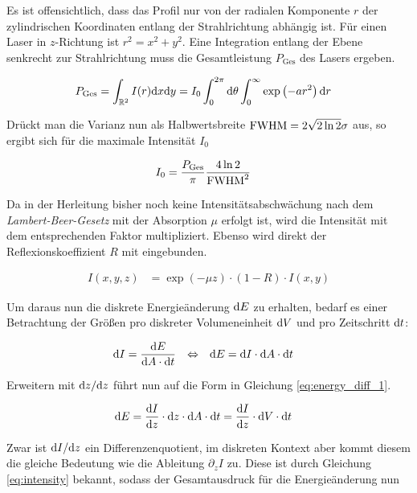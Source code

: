 		Es ist offensichtlich, dass das Profil nur von der radialen Komponente $r$ der
		zylindrischen Koordinaten entlang der Strahlrichtung abhängig ist. Für einen Laser in
		$z$-Richtung ist $r^2 = x^2 + y^2$. Eine Integration entlang der Ebene senkrecht zur
		Strahlrichtung muss die Gesamtleistung $P_\text{Ges}$ des Lasers ergeben.

		\begin{align}
			P_\text{Ges} &= \int_{\mathbb{R}^2} I(r) \dx\dx[y]
				= I_0 \int_0^{2\pi} \dx[\theta] \int_0^\infty \exp\left(-a r^2\right) \dx[r]
		\end{align}

		Drückt man die Varianz nun als Halbwertsbreite $\fwhm = 2\sqrt{2 \ln2}\sigma$ aus, so
		ergibt sich für die maximale Intensität $I_0$

		\begin{align}
			I_0 &= \frac{P_\text{Ges}}{\pi} \frac{4\ln2}{\fwhm^2}
		\end{align}

		Da in der Herleitung bisher noch keine Intensitätsabschwächung nach dem
		\emph{Lambert-Beer-Gesetz} mit der Absorption $\mu$ erfolgt ist, wird die Intensität mit
		dem entsprechenden Faktor multipliziert. Ebenso wird direkt der Reflexionskoeffizient
		$R$ mit eingebunden.

		\begin{align}
			I(x,y,z) &= \exp\left(-\mu z\right) \cdot (1-R) \cdot I(x,y)
			\label{eq:intensity}
		\end{align}

		Um daraus nun die diskrete Energieänderung $\dx[E]$ zu erhalten, bedarf es einer
		Betrachtung der Größen pro diskreter Volumeneinheit $\dx[V]$ und pro Zeitschritt $\dt$:

		\begin{align}
			\dx[I] &= \frac{\dx[E]}{\dx[A]\cdot\dt}
			&\Leftrightarrow&&
			\dx[E] &= \dx[I] \cdot \dx[A] \cdot \dt
		\end{align}

		Erweitern mit $\dx[z]/\dx[z]$ führt nun auf die Form in Gleichung
		\eqref{eq:energy_diff_1}.

		\begin{align}
			\dx[E] &= \frac{\dx[I]}{\dx[z]} \cdot \dx[z] \cdot \dx[A] \cdot \dt
				= \frac{\dx[I]}{\dx[z]} \cdot \dx[V] \cdot \dt
			\label{eq:energy_diff_1}
		\end{align}

		Zwar ist $\dx[I]/\dx[z]$ ein Differenzenquotient, im diskreten Kontext aber kommt diesem
		die gleiche Bedeutung wie die Ableitung $\partial_z I$ zu. Diese ist durch Gleichung
		\eqref{eq:intensity} bekannt, sodass der Gesamtausdruck für die Energieänderung nun

